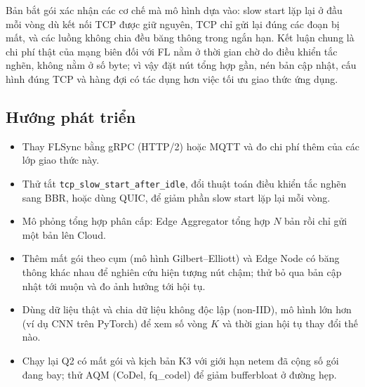 Bản bắt gói xác nhận các cơ chế mà mô hình dựa vào: slow start lặp lại ở đầu mỗi vòng dù kết nối TCP được giữ nguyên, TCP chỉ gửi lại đúng các đoạn bị mất, và các luồng không chia đều băng thông trong ngắn hạn. Kết luận chung là chi phí thật của mạng biên đối với FL nằm ở thời gian chờ do điều khiển tắc nghẽn, không nằm ở số byte; vì vậy đặt nút tổng hợp gần, nén bản cập nhật, cấu hình đúng TCP và hàng đợi có tác dụng hơn việc tối ưu giao thức ứng dụng.

\subsection*{Hướng phát triển}
\begin{itemize}
    \item Thay FLSync bằng gRPC (HTTP/2) hoặc MQTT và đo chi phí thêm của các lớp giao thức này.
    \item Thử tắt \nolinkurl{tcp_slow_start_after_idle}, đổi thuật toán điều khiển tắc nghẽn sang BBR, hoặc dùng QUIC, để giảm phần slow start lặp lại mỗi vòng.
    \item Mô phỏng tổng hợp phân cấp: Edge Aggregator tổng hợp $N$ bản rồi chỉ gửi một bản lên Cloud.
    \item Thêm mất gói theo cụm (mô hình Gilbert--Elliott) và Edge Node có băng thông khác nhau để nghiên cứu hiện tượng nút chậm; thử bỏ qua bản cập nhật tới muộn và đo ảnh hưởng tới hội tụ.
    \item Dùng dữ liệu thật và chia dữ liệu không độc lập (non-IID), mô hình lớn hơn (ví dụ CNN trên PyTorch) để xem số vòng $K$ và thời gian hội tụ thay đổi thế nào.
    \item Chạy lại Q2 có mất gói và kịch bản K3 với giới hạn netem đã cộng số gói đang bay; thử AQM (CoDel, fq\_codel) để giảm bufferbloat ở đường hẹp.
\end{itemize}

\cleardoublepage
